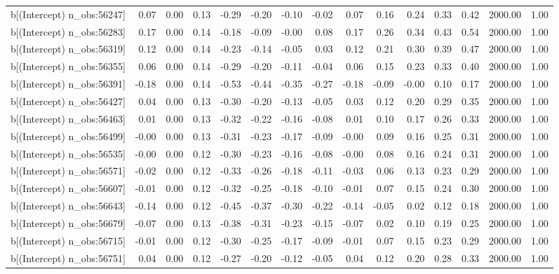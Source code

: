 \begin{table}[ht]
\begin{tabular}{rrrrrrrrrrrrrrr}
  b[(Intercept) n\_obs:56247] & 0.07 & 0.00 & 0.13 & -0.29 & -0.20 & -0.10 & -0.02 & 0.07 & 0.16 & 0.24 & 0.33 & 0.42 & 2000.00 & 1.00 \\ 
  b[(Intercept) n\_obs:56283] & 0.17 & 0.00 & 0.14 & -0.18 & -0.09 & -0.00 & 0.08 & 0.17 & 0.26 & 0.34 & 0.43 & 0.54 & 2000.00 & 1.00 \\ 
  b[(Intercept) n\_obs:56319] & 0.12 & 0.00 & 0.14 & -0.23 & -0.14 & -0.05 & 0.03 & 0.12 & 0.21 & 0.30 & 0.39 & 0.47 & 2000.00 & 1.00 \\ 
  b[(Intercept) n\_obs:56355] & 0.06 & 0.00 & 0.14 & -0.29 & -0.20 & -0.11 & -0.04 & 0.06 & 0.15 & 0.23 & 0.33 & 0.40 & 2000.00 & 1.00 \\ 
  b[(Intercept) n\_obs:56391] & -0.18 & 0.00 & 0.14 & -0.53 & -0.44 & -0.35 & -0.27 & -0.18 & -0.09 & -0.00 & 0.10 & 0.17 & 2000.00 & 1.00 \\ 
  b[(Intercept) n\_obs:56427] & 0.04 & 0.00 & 0.13 & -0.30 & -0.20 & -0.13 & -0.05 & 0.03 & 0.12 & 0.20 & 0.29 & 0.35 & 2000.00 & 1.00 \\ 
  b[(Intercept) n\_obs:56463] & 0.01 & 0.00 & 0.13 & -0.32 & -0.22 & -0.16 & -0.08 & 0.01 & 0.10 & 0.17 & 0.26 & 0.33 & 2000.00 & 1.00 \\ 
  b[(Intercept) n\_obs:56499] & -0.00 & 0.00 & 0.13 & -0.31 & -0.23 & -0.17 & -0.09 & -0.00 & 0.09 & 0.16 & 0.25 & 0.31 & 2000.00 & 1.00 \\ 
  b[(Intercept) n\_obs:56535] & -0.00 & 0.00 & 0.12 & -0.30 & -0.23 & -0.16 & -0.08 & -0.00 & 0.08 & 0.16 & 0.24 & 0.31 & 2000.00 & 1.00 \\ 
  b[(Intercept) n\_obs:56571] & -0.02 & 0.00 & 0.12 & -0.33 & -0.26 & -0.18 & -0.11 & -0.03 & 0.06 & 0.13 & 0.23 & 0.29 & 2000.00 & 1.00 \\ 
  b[(Intercept) n\_obs:56607] & -0.01 & 0.00 & 0.12 & -0.32 & -0.25 & -0.18 & -0.10 & -0.01 & 0.07 & 0.15 & 0.24 & 0.30 & 2000.00 & 1.00 \\ 
  b[(Intercept) n\_obs:56643] & -0.14 & 0.00 & 0.12 & -0.45 & -0.37 & -0.30 & -0.22 & -0.14 & -0.05 & 0.02 & 0.12 & 0.18 & 2000.00 & 1.00 \\ 
  b[(Intercept) n\_obs:56679] & -0.07 & 0.00 & 0.13 & -0.38 & -0.31 & -0.23 & -0.15 & -0.07 & 0.02 & 0.10 & 0.19 & 0.25 & 2000.00 & 1.00 \\ 
  b[(Intercept) n\_obs:56715] & -0.01 & 0.00 & 0.12 & -0.30 & -0.25 & -0.17 & -0.09 & -0.01 & 0.07 & 0.15 & 0.23 & 0.29 & 2000.00 & 1.00 \\ 
  b[(Intercept) n\_obs:56751] & 0.04 & 0.00 & 0.12 & -0.27 & -0.20 & -0.12 & -0.05 & 0.04 & 0.12 & 0.20 & 0.28 & 0.33 & 2000.00 & 1.00 \\ 

\end{tabular}
\end{table}
